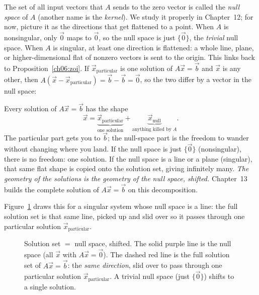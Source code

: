 The set of all input vectors that $A$ sends to the zero vector is called
the \emph{null space} of $A$ (another name is the \emph{kernel}). We study
it properly in Chapter~12; for now, picture it as the directions that get
flattened to a point. When $A$ is nonsingular, only $\vec 0$ maps to
$\vec 0$, so the null space is just $\{\vec 0\}$, the \emph{trivial} null
space. When $A$ is singular, at least one direction is flattened: a whole
line, plane, or higher-dimensional flat of nonzero vectors is sent to the
origin. This links back to Proposition~\ref{ch06:zoi}. If
$\vec x_{\text{particular}}$ is one solution of $A\vec x=\vec b$ and $\vec x$
is any other, then
$A(\vec x-\vec x_{\text{particular}})=\vec b-\vec b=\vec 0$, so the two
differ by a vector in the null space:

\begin{aestheticbox}
Every solution of $A\vec x=\vec b$ has the shape
\[
  \vec x = \underbrace{\vec x_{\text{particular}}}_{\text{one solution}}
         + \underbrace{\vec x_{\text{null}}}_{\text{anything killed by }A}.
\]
The particular part gets you to $\vec b$; the null-space part is the freedom
to wander without changing where you land. If the null space is just
$\{\vec0\}$ (nonsingular), there is no freedom: one solution. If the null
space is a line or a plane (singular), that same flat shape is copied onto
the solution set, giving infinitely many. \emph{The geometry of the
solutions is the geometry of the null space, shifted.} Chapter~13 builds
the complete solution of $A\vec x=\vec b$ on this decomposition.
\end{aestheticbox}

Figure~\ref{ch06:shift} draws this for a singular system whose null space is
a line: the full solution set is that same line, picked up and slid over so
it passes through one particular solution $\vec x_{\text{particular}}$.

\begin{figure}[H]
\centering
{}
\caption{Solution set $=$ null space, shifted. The solid purple line is the
null space (all $\vec x$ with $A\vec x=\vec0$). The dashed red line is the
full solution set of $A\vec x=\vec b$: the \emph{same direction}, slid over to
pass through one particular solution $\vec x_{\text{particular}}$. A trivial null space
(just $\{\vec 0\}$) shifts to a single solution.}
\label{ch06:shift}
\end{figure}

